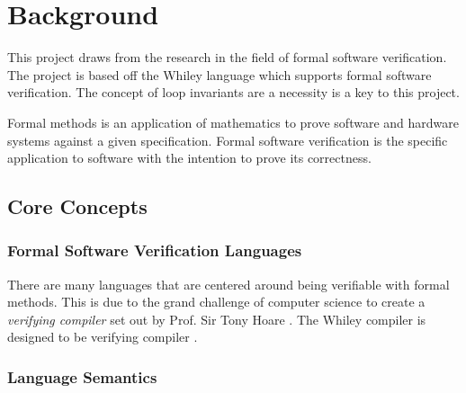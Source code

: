 \chapter{Background}\label{C:background}
%


This project draws from the research in the field of formal software verification.
The project is based off the Whiley language which supports formal software
verification. %
The concept of loop invariants are a necessity is a key to this project.

Formal methods is an application of mathematics to prove software and hardware
systems against a given specification. %
Formal software verification is the specific application to software with
the intention to prove its correctness.



\section{Core Concepts}

\subsection{Formal Software Verification Languages}

There are many languages that are centered around being verifiable
with formal methods.
This is due to the grand challenge of computer science
to create a \textit{verifying compiler} set out by Prof. Sir Tony Hoare \cite{Hoare-grand}.
The Whiley compiler is designed to be verifying compiler \cite{whiley-origin}.

\subsection{Language Semantics}
%

